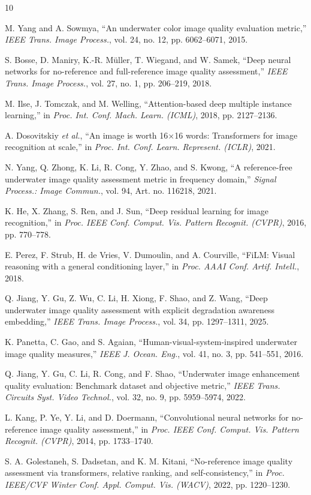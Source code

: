 \documentclass[conference]{IEEEtran}
\begin{document}
\begin{thebibliography}{10}

M. Yang and A. Sowmya, ``An underwater color image quality evaluation metric,''
\emph{IEEE Trans. Image Process.}, vol. 24, no. 12, pp. 6062--6071, 2015.

S. Bosse, D. Maniry, K.-R. M\"uller, T. Wiegand, and W. Samek, ``Deep neural networks for no-reference and full-reference image quality assessment,''
\emph{IEEE Trans. Image Process.}, vol. 27, no. 1, pp. 206--219, 2018.

M. Ilse, J. Tomczak, and M. Welling, ``Attention-based deep multiple instance learning,''
in \emph{Proc. Int. Conf. Mach. Learn. (ICML)}, 2018, pp. 2127--2136.

A. Dosovitskiy \emph{et al.}, ``An image is worth 16$\times$16 words: Transformers for image recognition at scale,''
in \emph{Proc. Int. Conf. Learn. Represent. (ICLR)}, 2021.

N. Yang, Q. Zhong, K. Li, R. Cong, Y. Zhao, and S. Kwong, ``A reference-free underwater image quality assessment metric in frequency domain,''
\emph{Signal Process.: Image Commun.}, vol. 94, Art. no. 116218, 2021.

K. He, X. Zhang, S. Ren, and J. Sun, ``Deep residual learning for image recognition,''
in \emph{Proc. IEEE Conf. Comput. Vis. Pattern Recognit. (CVPR)}, 2016, pp. 770--778.

E. Perez, F. Strub, H. de Vries, V. Dumoulin, and A. Courville, ``FiLM: Visual reasoning with a general conditioning layer,''
in \emph{Proc. AAAI Conf. Artif. Intell.}, 2018.

Q. Jiang, Y. Gu, Z. Wu, C. Li, H. Xiong, F. Shao, and Z. Wang, ``Deep underwater image quality assessment with explicit degradation awareness embedding,''
\emph{IEEE Trans. Image Process.}, vol. 34, pp. 1297--1311, 2025.

K. Panetta, C. Gao, and S. Agaian, ``Human-visual-system-inspired underwater image quality measures,''
\emph{IEEE J. Ocean. Eng.}, vol. 41, no. 3, pp. 541--551, 2016.

Q. Jiang, Y. Gu, C. Li, R. Cong, and F. Shao, ``Underwater image enhancement quality evaluation: Benchmark dataset and objective metric,''
\emph{IEEE Trans. Circuits Syst. Video Technol.}, vol. 32, no. 9, pp. 5959--5974, 2022.

L. Kang, P. Ye, Y. Li, and D. Doermann, ``Convolutional neural networks for no-reference image quality assessment,''
in \emph{Proc. IEEE Conf. Comput. Vis. Pattern Recognit. (CVPR)}, 2014, pp. 1733--1740.

S. A. Golestaneh, S. Dadsetan, and K. M. Kitani, ``No-reference image quality assessment via transformers, relative ranking, and self-consistency,''
in \emph{Proc. IEEE/CVF Winter Conf. Appl. Comput. Vis. (WACV)}, 2022, pp. 1220--1230.

\end{thebibliography}
\end{document}

